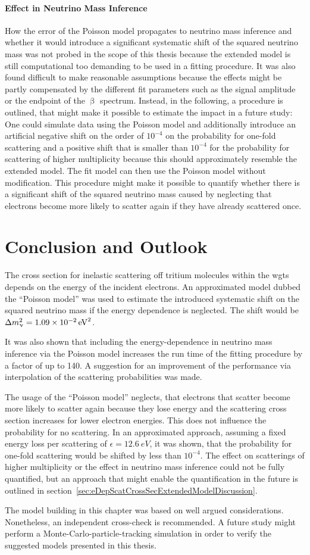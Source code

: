 \paragraph{Effect in Neutrino Mass Inference}
How the error of the Poisson model propagates to neutrino mass inference and whether it would introduce a significant systematic shift of the squared neutrino mass was not probed in the scope of this thesis because the extended model is still computational too demanding to be used in a fitting procedure. It was also found difficult to make reasonable assumptions because the effects might be partly compensated by the different fit parameters such as the signal amplitude or the endpoint of the $\upbeta$ spectrum. Instead, in the following, a procedure is outlined, that might make it possible to estimate the impact in a future study: One could simulate data using the Poisson model and additionally introduce an artificial negative shift on the order of $10^{-4}$ on the probability for one-fold scattering and a positive shift that is smaller than $10^{-4}$ for the probability for scattering of higher multiplicity because this should approximately resemble the extended model. The fit model can then use the Poisson model without modification. This procedure might make it possible to quantify whether there is a significant shift of the squared neutrino mass caused by neglecting that electrons become more likely to scatter again if they have already scattered once.

\section{Conclusion and Outlook}
\label{sec:eDepScatCrossSecConclusion}
The cross section for inelastic scattering off tritium molecules within the \gls{wgts} depends on the energy of the incident electrons. An approximated model dubbed the ``Poisson model'' was used to estimate the introduced systematic shift on the squared neutrino mass if the energy dependence is neglected. The shift would be $\Delta m_\upnu^2 = \SI{1.09e-2}{eV^2}$.

It was also shown that including the energy-dependence in neutrino mass inference via the Poisson model increases the run time of the fitting procedure by a factor of up to 140. A suggestion for an improvement of the performance via interpolation of the scattering probabilities was made.

The usage of the ``Poisson model'' neglects, that electrons that scatter become more likely to scatter again because they lose energy and the scattering cross section increases for lower electron energies. This does not influence the probability for no scattering. In an approximated approach, assuming a fixed energy loss per scattering of $\epsilon=\SI{12.6}{eV}$, it was shown, that the probability for one-fold scattering would be shifted by less than $10^{-4}$. The effect on scatterings of higher multiplicity or the effect in neutrino mass inference could not be fully quantified, but an approach that might enable the quantification in the future is outlined in section~\ref{sec:eDepScatCrossSecExtendedModelDiscussion}.

The model building in this chapter was based on well argued considerations. Nonetheless, an independent cross-check is recommended. A future study might perform a Monte-Carlo-particle-tracking simulation in order to verify the suggested models presented in this thesis.
